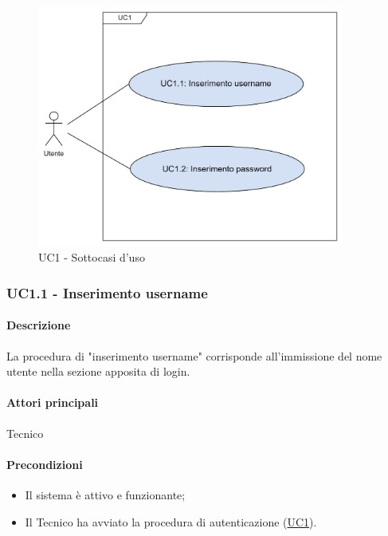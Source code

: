\begin{figure}[H]
  \centering
  \includegraphics[width=0.90\textwidth]{assets/uc1_1.png}
  \caption{UC1 - Sottocasi d'uso}
\end{figure}


\subsubsection{UC1.1 - Inserimento username}\label{UC1point1}

\paragraph*{Descrizione}
La procedura di "inserimento username" corrisponde all'immissione del nome utente nella sezione apposita di login.

\paragraph*{Attori principali}
Tecnico

\paragraph*{Precondizioni}
\begin{itemize}
  \item Il sistema è attivo e funzionante;
  \item Il Tecnico ha avviato la procedura di autenticazione (\hyperref[UC1]{UC1}).  
\end{itemize}

